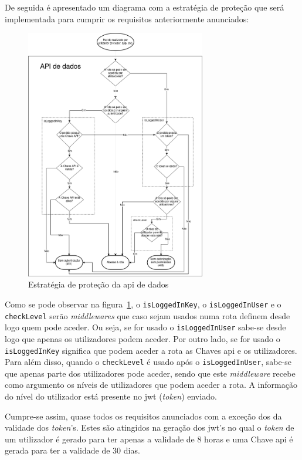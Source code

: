 De seguida é apresentado um diagrama com a estratégia de proteção que será implementada para cumprir os requisitos anteriormente anunciados:
\begin{figure}[H]
    \centering
    \includegraphics[width=0.7\textwidth]{img/protecaoStrag.png}
    \caption{Estratégia de proteção da \acrshort{api} de dados}\label{fig:protStrag}
\end{figure}

Como se pode observar na figura~\ref{fig:protStrag}, o \texttt{isLoggedInKey}, o \texttt{isLoggedInUser} e o \texttt{checkLevel} serão \textit{middlewares} que caso sejam usados numa rota definem desde logo quem pode aceder. Ou seja, se for usado o \texttt{isLoggedInUser} sabe-se desde logo que apenas os utilizadores podem aceder. Por outro lado, se for usado o \texttt{isLoggedInKey} significa que podem aceder a rota as Chaves \acrshort{api} e os utilizadores. Para além disso, quando o \texttt{checkLevel} é usado após o \texttt{isLoggedInUser}, sabe-se que apenas parte dos utilizadores pode aceder, sendo que este \textit{middleware} recebe como argumento os níveis de utilizadores que podem aceder a rota. A informação do nível do utilizador está presente no \acrshort{jwt} (\textit{token}) enviado.

Cumpre-se assim, quase todos os requisitos anunciados com a exceção dos da validade dos \textit{token}'s. Estes são atingidos na geração dos \acrshort{jwt}'s no qual o \textit{token} de um utilizador é gerado para ter apenas a validade de 8 horas e uma Chave \acrshort{api} é gerada para ter a validade de 30 dias.

